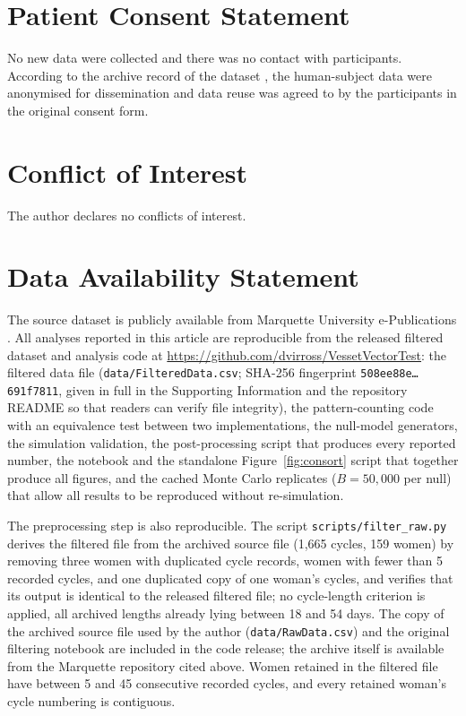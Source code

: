 \documentclass[12pt]{article}
\begin{document}
\section*{Patient Consent Statement}

No new data were collected and there was no contact with participants. According to the
archive record of the dataset \citep{fehring2012data}, the human-subject data were
anonymised for dissemination and data reuse was agreed to by the participants in the
original consent form.

\section*{Conflict of Interest}

The author declares no conflicts of interest.

\section*{Data Availability Statement}
\label{sec:das}

The source dataset is publicly available from Marquette University e-Publications
\citep{fehring2012data}. All analyses reported in this article are
reproducible from the released filtered dataset and analysis code at
\url{https://github.com/dvirross/VessetVectorTest}: the filtered data file
(\texttt{data/FilteredData.csv}; SHA-256 fingerprint \texttt{508ee88e\ldots691f7811},
given in full in the Supporting Information and the repository README so that readers can
verify file integrity), the pattern-counting code with an equivalence test between two
implementations, the null-model generators, the simulation validation, the
post-processing script that produces every reported number, the notebook and the
standalone Figure~\ref{fig:consort} script that together produce all figures, and the
cached Monte Carlo replicates ($B = 50{,}000$ per null) that allow
all results to be reproduced without re-simulation.

The preprocessing step is also reproducible. The script
\texttt{scripts/filter\_raw.py} derives the filtered file from the archived source file
(1,665 cycles, 159 women) by removing three women with duplicated cycle records, women
with fewer than 5 recorded cycles, and one duplicated copy of one woman's cycles, and
verifies that its output is identical to the released filtered file; no cycle-length
criterion is applied, all archived lengths already lying between 18 and 54 days. The
copy of the archived source file used by the author (\texttt{data/RawData.csv}) and the
original filtering notebook are included in the code release; the archive itself is
available from the Marquette repository cited above. Women retained
in the filtered file have between 5 and 45 consecutive recorded cycles, and every
retained woman's cycle numbering is contiguous.
\end{document}
